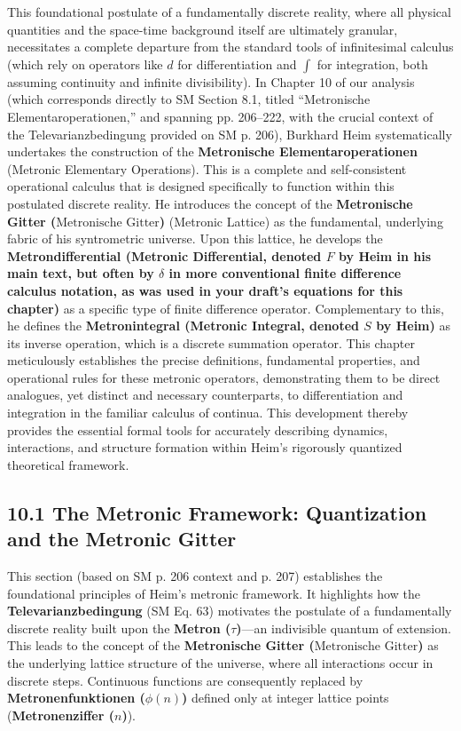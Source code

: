 \documentclass[12pt]{article}
\newcommand{\q}[1]{\enquote{#1}}
\newcommand{\metron}{\tau}
\newcommand{\metronischegitter}{\text{Metronische Gitter}}
\newcommand{\metrondifferential}{F} %
\newcommand{\metronintegral}{S} %
\newcommand{\metronenfunktion}{\phi(n)}
\newcommand{\metronenziffer}{n}
\begin{document}
This foundational postulate of a fundamentally discrete reality, where all physical quantities and the space-time background itself are ultimately granular, necessitates a complete departure from the standard tools of infinitesimal calculus (which rely on operators like \( d \) for differentiation and \( \int \) for integration, both assuming continuity and infinite divisibility). In Chapter 10 of our analysis (which corresponds directly to SM Section 8.1, titled \q{Metronische Elementaroperationen,} and spanning pp. 206–222, with the crucial context of the Televarianzbedingung provided on SM p. 206), Burkhard Heim systematically undertakes the construction of the \textbf{Metronische Elementaroperationen} (Metronic Elementary Operations). This is a complete and self-consistent operational calculus that is designed specifically to function within this postulated discrete reality. He introduces the concept of the \textbf{Metronische Gitter (\(\metronischegitter\))} (Metronic Lattice) as the fundamental, underlying fabric of his syntrometric universe. Upon this lattice, he develops the \textbf{Metrondifferential (Metronic Differential, denoted \( \metrondifferential \) by Heim in his main text, but often by \( \delta \) in more conventional finite difference calculus notation, as was used in your draft's equations for this chapter)} as a specific type of finite difference operator. Complementary to this, he defines the \textbf{Metronintegral (Metronic Integral, denoted \( \metronintegral \) by Heim)} as its inverse operation, which is a discrete summation operator. This chapter meticulously establishes the precise definitions, fundamental properties, and operational rules for these metronic operators, demonstrating them to be direct analogues, yet distinct and necessary counterparts, to differentiation and integration in the familiar calculus of continua. This development thereby provides the essential formal tools for accurately describing dynamics, interactions, and structure formation within Heim’s rigorously quantized theoretical framework.

\subsection{10.1 The Metronic Framework: Quantization and the Metronic Gitter}
\label{sec:metronic_framework}

This section (based on SM p. 206 context and p. 207) establishes the foundational principles of Heim's metronic framework. It highlights how the \textbf{Televarianzbedingung} (SM Eq. 63) motivates the postulate of a fundamentally discrete reality built upon the \textbf{Metron (\(\metron\))}—an indivisible quantum of extension. This leads to the concept of the \textbf{Metronische Gitter (\(\metronischegitter\))} as the underlying lattice structure of the universe, where all interactions occur in discrete steps. Continuous functions are consequently replaced by \textbf{Metronenfunktionen (\(\metronenfunktion\))} defined only at integer lattice points (\textbf{Metronenziffer (\(\metronenziffer\))}).
\end{document}
